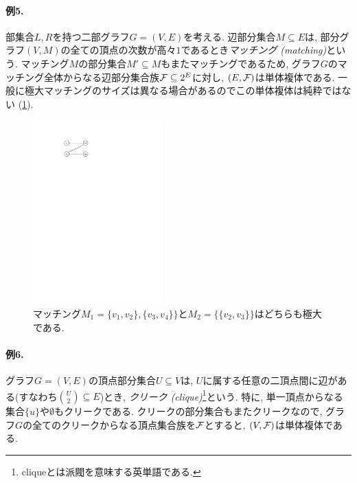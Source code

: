 \paragraph*{例5.}
部集合$L,R$を持つ二部グラフ$G=(V,E)$を考える.
辺部分集合$M\subseteq E$は, 部分グラフ$(V,M)$の全ての頂点の次数が高々$1$であるとき\emph{マッチング (matching)}という.
マッチング$M$の部分集合$M'\subseteq M$もまたマッチングであるため,
グラフ$G$のマッチング全体からなる辺部分集合族$\mathcal{F}\subseteq 2^E$に対し, $(E,\mathcal{F})$は単体複体である.
一般に極大マッチングのサイズは異なる場合があるのでこの単体複体は純粋ではない (\cref{fig:matching}).
\begin{figure}[htbp]
    \begin{center}
        \includegraphics[width=5cm]{images/matching.pdf}
    \end{center}
    \caption{マッチング$M_1=\{v_1,v_2\},\{v_3,v_4\}\}$と$M_2=\{\{v_2,v_3\}\}$はどちらも極大である. \label{fig:matching}}
\end{figure}

\paragraph*{例6.}
グラフ$G=(V,E)$の頂点部分集合$U\subseteq V$は, $U$に属する任意の二頂点間に辺がある(すなわち$\binom{U}{2}\subseteq E$)とき, \emph{クリーク (clique)}\footnote{cliqueとは派閥を意味する英単語である.}という.
特に, 単一頂点からなる集合$\{u\}$や$\emptyset$もクリークである.
クリークの部分集合もまたクリークなので,
グラフ$G$の全てのクリークからなる頂点集合族を$\mathcal{F}$とすると, $(V,\mathcal{F})$は単体複体である.


